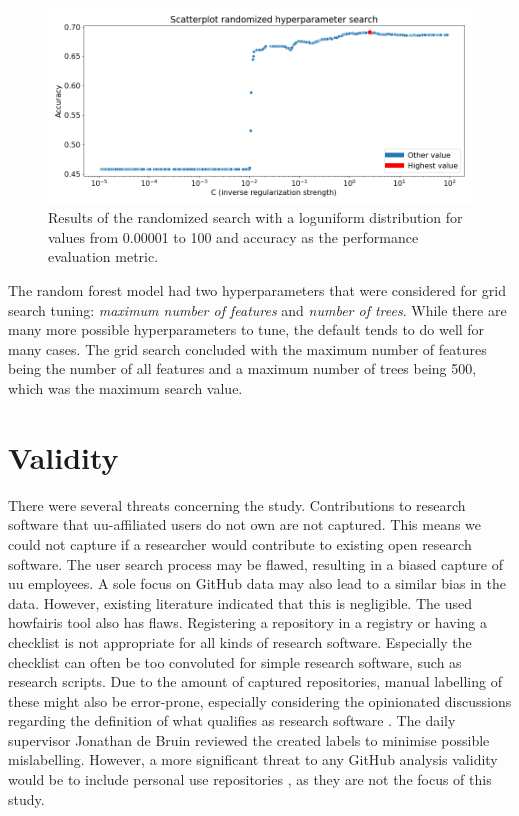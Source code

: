 

\begin{figure}[h!]
\centerline{
\includegraphics[scale=0.5]{figures_results/stats_scatter_randomsearch_logit.png}}
\caption{Results of the randomized search with a loguniform distribution for values from 0.00001 to 100 and accuracy as the performance evaluation metric.
\label{fig:randomizedsearch}}
\end{figure}

The random forest model had two hyperparameters that were considered for grid search tuning: \textit{maximum number of features} and \textit{number of trees}. While there are many more possible hyperparameters to tune, the default tends to do well for many cases. The grid search concluded with the maximum number of features being the number of all features and a maximum number of trees being 500, which was the maximum search value.

\newpage
\section{Validity}
\label{sec:valid}
There were several threats concerning the study. 
Contributions to research software that \acrshort{uu}-affiliated users do not own are not captured. This means we could not capture if a researcher would contribute to existing open research software. 
The user search process may be flawed, resulting in a biased capture of \acrshort{uu} employees. 
A sole focus on GitHub data may also lead to a similar bias in the data. However, existing literature indicated that this is negligible. 
The used howfairis tool \cite{Spaaks_howfairis} also has flaws. Registering a repository in a registry or having a checklist is not appropriate for all kinds of research software. Especially the checklist can often be too convoluted for simple research software, such as research scripts.
Due to the amount of captured repositories, manual labelling of these might also be error-prone, especially considering the opinionated discussions regarding the definition of what qualifies as research software \cite{gruenpeter_defining_2021}. The daily supervisor Jonathan de Bruin reviewed the created labels to minimise possible mislabelling. However, a more significant threat to any GitHub analysis validity would be to include personal use repositories \cite{kalliamvakou_promises_2014}, as they are not the focus of this study. 

